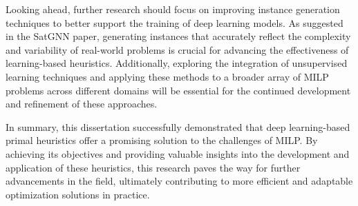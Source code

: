 Looking ahead, further research should focus on improving instance generation techniques to better support the training of deep learning models. As suggested in the SatGNN paper, generating instances that accurately reflect the complexity and variability of real-world problems is crucial for advancing the effectiveness of learning-based heuristics. Additionally, exploring the integration of unsupervised learning techniques and applying these methods to a broader array of MILP problems across different domains will be essential for the continued development and refinement of these approaches.

In summary, this dissertation successfully demonstrated that deep learning-based primal heuristics offer a promising solution to the challenges of MILP. By achieving its objectives and providing valuable insights into the development and application of these heuristics, this research paves the way for further advancements in the field, ultimately contributing to more efficient and adaptable optimization solutions in practice.

